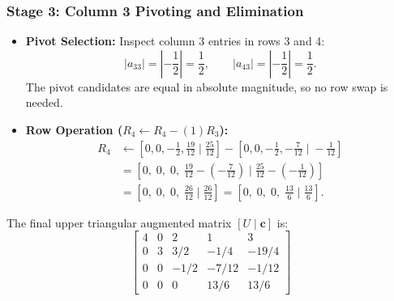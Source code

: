 \documentclass[11pt,a4paper]{article}
\begin{document}
\subsubsection*{Stage 3: Column 3 Pivoting and Elimination}
\begin{itemize}
    \item \textbf{Pivot Selection:} Inspect column 3 entries in rows 3 and 4:
    \[
    |a_{33}| = \left|-\frac{1}{2}\right| = \frac{1}{2}, \qquad |a_{43}| = \left|-\frac{1}{2}\right| = \frac{1}{2}.
    \]
    The pivot candidates are equal in absolute magnitude, so no row swap is needed.
    \item \textbf{Row Operation ($R_4 \leftarrow R_4 - (1)R_3$):}
    \begin{align*}
    R_4 &\leftarrow \left[0, 0, -\frac{1}{2}, \frac{19}{12} \;\Big|\; \frac{25}{12}\right] - \left[0, 0, -\frac{1}{2}, -\frac{7}{12} \;\Big|\; -\frac{1}{12}\right] \\
        &= \left[0, \; 0, \; 0, \; \frac{19}{12} - \left(-\frac{7}{12}\right) \;\Big|\; \frac{25}{12} - \left(-\frac{1}{12}\right)\right] \\
        &= \left[0, \; 0, \; 0, \; \frac{26}{12} \;\Big|\; \frac{26}{12}\right] = \left[0, \; 0, \; 0, \; \frac{13}{6} \;\Big|\; \frac{13}{6}\right].
    \end{align*}
\end{itemize}

\noindent The final upper triangular augmented matrix $[U \mid \mathbf{c}]$ is:
\[
\left[\begin{array}{cccc|c}
4 & 0 & 2 & 1 & 3 \\
0 & 3 & 3/2 & -1/4 & -19/4 \\
0 & 0 & -1/2 & -7/12 & -1/12 \\
0 & 0 & 0 & 13/6 & 13/6
\end{array}\right]
\]
\end{document}
